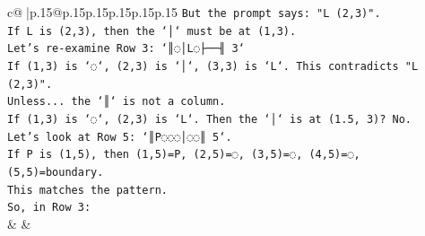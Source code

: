 \documentclass{article}
\begin{document}
{\begin{supertabular}{c@{$\;$}|p{.15\linewidth}@{}p{.15\linewidth}p{.15\linewidth}p{.15\linewidth}p{.15\linewidth}p{.15\linewidth}}
{{{\texttt{But the prompt says: "L (2,3)".} \\
\texttt{If L is (2,3), then the `│` must be at (1,3).} \\
\texttt{Let's re{-}examine Row 3: `║◌│L◌├──╢ 3`} \\
\texttt{If (1,3) is `◌`, (2,3) is `│`, (3,3) is `L`. This contradicts "L (2,3)".} \\
\texttt{Unless... the `║` is not a column.} \\
\texttt{If (1,3) is `◌`, (2,3) is `L`. Then the `│` is at (1.5, 3)? No.} \\
\texttt{Let's look at Row 5: `║P◌◌◌│◌◌║ 5`.} \\
\texttt{If P is (1,5), then (1,5)=P, (2,5)=◌, (3,5)=◌, (4,5)=◌, (5,5)=boundary.} \\
\texttt{This matches the pattern.} \\
\texttt{So, in Row 3:} \\
            }
        }
    }
    & & \\ \\


\end{supertabular}}
\end{document}
